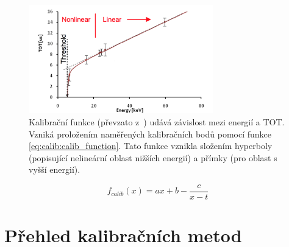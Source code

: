\begin{figure}[th!]
	\begin{center}
		\includegraphics[width=8cm]{figures/calib_function.png}
		\caption{Kalibrační funkce (převzato z~\cite{Jakubek2011S262}) udává závislost mezi energií a TOT. Vzniká proložením naměřených kalibračních bodů pomocí funkce \ref{eq:calib:calib_function}. Tato funkce vznikla složením hyperboly (popisující nelineární oblast nižších energií) a přímky (pro oblast s vyšší energií).}
		\label{fig:calib:calib_function}
	\end{center}
\end{figure}


\begin{equation}\label{eq:calib:calib_function}
	f_{calib}(x) = ax + b - \frac{c}{x-t}
\end{equation}


\section{Přehled kalibračních metod}

